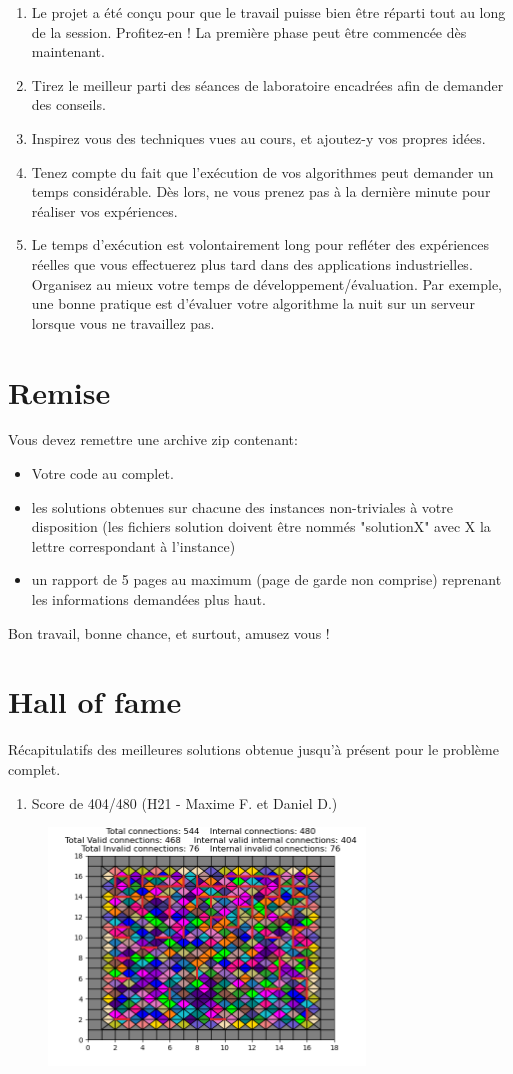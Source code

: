 \documentclass[a4paper,11pt,final,fleqn]{article}
\begin{document}
\begin{enumerate}
\item Le projet a été conçu pour que le travail puisse bien être réparti tout au long de la session. Profitez-en !
La première phase peut être commencée dès maintenant.
\item Tirez le meilleur parti des séances de laboratoire encadrées afin de demander des conseils.
\item Inspirez vous des techniques vues au cours, et ajoutez-y vos propres idées.
\item Tenez compte du fait que l'exécution de vos algorithmes peut demander un temps considérable.
Dès lors, ne vous prenez pas à la dernière minute pour réaliser vos expériences.
\item Le temps d'exécution est volontairement long pour refléter des expériences réelles que vous effectuerez plus tard dans des applications industrielles. Organisez au mieux votre temps de développement/évaluation. Par exemple, une bonne pratique est d'évaluer votre algorithme la nuit sur un serveur lorsque vous ne travaillez pas.
\end{enumerate}


\section*{Remise}
Vous devez remettre une archive zip contenant:
\begin{itemize}
\item Votre code au complet.
\item les solutions obtenues sur chacune des instances non-triviales à votre disposition (les fichiers solution doivent être nommés "solutionX" avec X la lettre correspondant à l'instance)
\item un rapport de 5 pages au maximum (page de garde non comprise) reprenant les informations demandées plus haut.
\end{itemize}

Bon travail, bonne chance, et surtout, amusez vous !

\section*{Hall of fame}
Récapitulatifs des meilleures solutions obtenue jusqu'à présent pour le problème complet.

\begin{enumerate}
\item Score de 404/480 (H21 - Maxime F. et Daniel D.)
\end{enumerate}

\begin{figure}[!ht]
\centering
\includegraphics[width=0.75\textwidth]{img/best-sol-so-far}
\end{figure}
\end{document}
